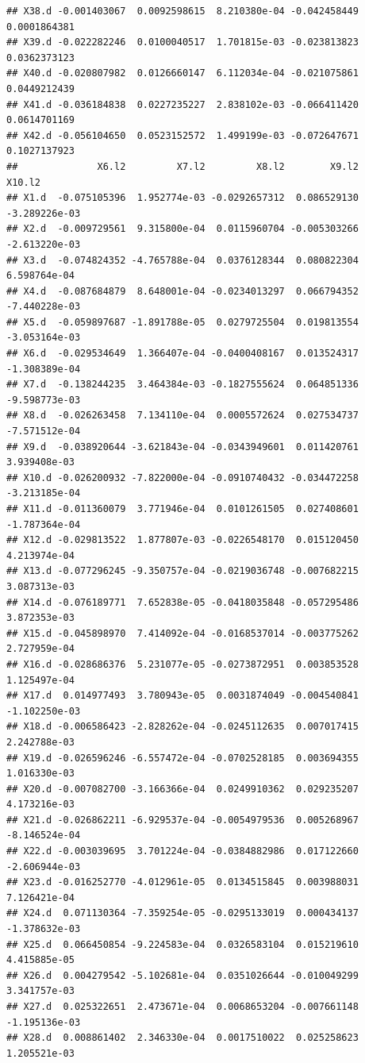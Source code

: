 \documentclass[]{article}
\begin{document}
\begin{verbatim}
## X38.d -0.001403067  0.0092598615  8.210380e-04 -0.042458449  0.0001864381
## X39.d -0.022282246  0.0100040517  1.701815e-03 -0.023813823  0.0362373123
## X40.d -0.020807982  0.0126660147  6.112034e-04 -0.021075861  0.0449212439
## X41.d -0.036184838  0.0227235227  2.838102e-03 -0.066411420  0.0614701169
## X42.d -0.056104650  0.0523152572  1.499199e-03 -0.072647671  0.1027137923
##              X6.l2         X7.l2         X8.l2        X9.l2        X10.l2
## X1.d  -0.075105396  1.952774e-03 -0.0292657312  0.086529130 -3.289226e-03
## X2.d  -0.009729561  9.315800e-04  0.0115960704 -0.005303266 -2.613220e-03
## X3.d  -0.074824352 -4.765788e-04  0.0376128344  0.080822304  6.598764e-04
## X4.d  -0.087684879  8.648001e-04 -0.0234013297  0.066794352 -7.440228e-03
## X5.d  -0.059897687 -1.891788e-05  0.0279725504  0.019813554 -3.053164e-03
## X6.d  -0.029534649  1.366407e-04 -0.0400408167  0.013524317 -1.308389e-04
## X7.d  -0.138244235  3.464384e-03 -0.1827555624  0.064851336 -9.598773e-03
## X8.d  -0.026263458  7.134110e-04  0.0005572624  0.027534737 -7.571512e-04
## X9.d  -0.038920644 -3.621843e-04 -0.0343949601  0.011420761  3.939408e-03
## X10.d -0.026200932 -7.822000e-04 -0.0910740432 -0.034472258 -3.213185e-04
## X11.d -0.011360079  3.771946e-04  0.0101261505  0.027408601 -1.787364e-04
## X12.d -0.029813522  1.877807e-03 -0.0226548170  0.015120450  4.213974e-04
## X13.d -0.077296245 -9.350757e-04 -0.0219036748 -0.007682215  3.087313e-03
## X14.d -0.076189771  7.652838e-05 -0.0418035848 -0.057295486  3.872353e-03
## X15.d -0.045898970  7.414092e-04 -0.0168537014 -0.003775262  2.727959e-04
## X16.d -0.028686376  5.231077e-05 -0.0273872951  0.003853528  1.125497e-04
## X17.d  0.014977493  3.780943e-05  0.0031874049 -0.004540841 -1.102250e-03
## X18.d -0.006586423 -2.828262e-04 -0.0245112635  0.007017415  2.242788e-03
## X19.d -0.026596246 -6.557472e-04 -0.0702528185  0.003694355  1.016330e-03
## X20.d -0.007082700 -3.166366e-04  0.0249910362  0.029235207  4.173216e-03
## X21.d -0.026862211 -6.929537e-04 -0.0054979536  0.005268967 -8.146524e-04
## X22.d -0.003039695  3.701224e-04 -0.0384882986  0.017122660 -2.606944e-03
## X23.d -0.016252770 -4.012961e-05  0.0134515845  0.003988031  7.126421e-04
## X24.d  0.071130364 -7.359254e-05 -0.0295133019  0.000434137 -1.378632e-03
## X25.d  0.066450854 -9.224583e-04  0.0326583104  0.015219610  4.415885e-05
## X26.d  0.004279542 -5.102681e-04  0.0351026644 -0.010049299  3.341757e-03
## X27.d  0.025322651  2.473671e-04  0.0068653204 -0.007661148 -1.195136e-03
## X28.d  0.008861402  2.346330e-04  0.0017510022  0.025258623  1.205521e-03

\end{verbatim}
\end{document}
